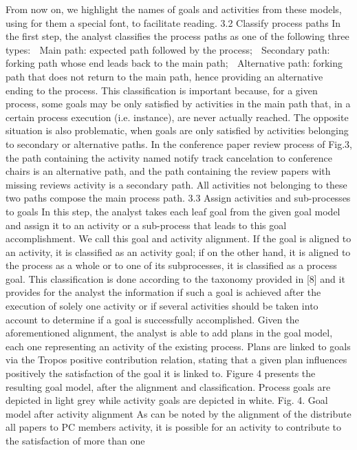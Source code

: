 From now on, we highlight the names of goals and activities from these models,
using for them a special font, to facilitate reading.
3.2 Classify process paths
In the first step, the analyst classifies the process paths as one of the following three
types:
 Main path: expected path followed by the process;
 Secondary path: forking path whose end leads back to the main path;
 Alternative path: forking path that does not return to the main path, hence
providing an alternative ending to the process.
This classification is important because, for a given process, some goals may be only
satisfied by activities in the main path that, in a certain process execution (i.e. instance), 
are never actually reached. The opposite situation is also problematic, when goals are
only satisfied by activities belonging to secondary or alternative paths.
In the conference paper review process of Fig.3, the path containing the activity
named notify track cancelation to conference chairs is an alternative path, and the
path containing the review papers with missing reviews activity is a secondary path.
All activities not belonging to these two paths compose the main process path.
3.3 Assign activities and sub-processes to goals
In this step, the analyst takes each leaf goal from the given goal model and assign it
to an activity or a sub-process that leads to this goal accomplishment. We call this goal
and activity alignment. If the goal is aligned to an activity, it is classified as an activity
goal; if on the other hand, it is aligned to the process as a whole or to one of its subprocesses, it is classified as a process goal. This classification is done according to the
taxonomy provided in [8] and it provides for the analyst the information if such a goal
is achieved after the execution of solely one activity or if several activities should be
taken into account to determine if a goal is successfully accomplished.
Given the aforementioned alignment, the analyst is able to add plans in the goal
model, each one representing an activity of the existing process. Plans are linked to
goals via the Tropos positive contribution relation, stating that a given plan influences
positively the satisfaction of the goal it is linked to. Figure 4 presents the resulting goal
model, after the alignment and classification. Process goals are depicted in light grey
while activity goals are depicted in white.
Fig. 4. Goal model after activity alignment
As can be noted by the alignment of the distribute all papers to PC members
activity, it is possible for an activity to contribute to the satisfaction of more than one
